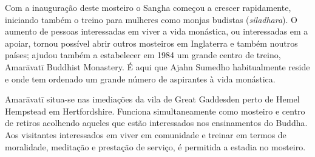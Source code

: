 Com a inauguração deste mosteiro o Sangha começou a crescer rapidamente,
iniciando também o treino para mulheres como monjas budistas (\emph{siladhara}).
O aumento de pessoas interessadas em viver a vida monástica, ou interessadas em
a apoiar, tornou possível abrir outros mosteiros em Inglaterra e também noutros
países; ajudou também a estabelecer em 1984 um grande centro de treino,
Amarāvatī Buddhist Monastery. É aqui que Ajahn Sumedho habitualmente reside e
onde tem ordenado um grande número de aspirantes à vida monástica.

Amarāvatī situa-se nas imediações da vila de Great Gaddesden perto de Hemel
Hempstead em Hertfordshire. Funciona simultaneamente como mosteiro e centro de
retiros acolhendo aqueles que estão interessados nos ensinamentos do Buddha. Aos
visitantes interessados em viver em comunidade e treinar em termos de
moralidade, meditação e prestação de serviço, é permitida a estadia no mosteiro.

